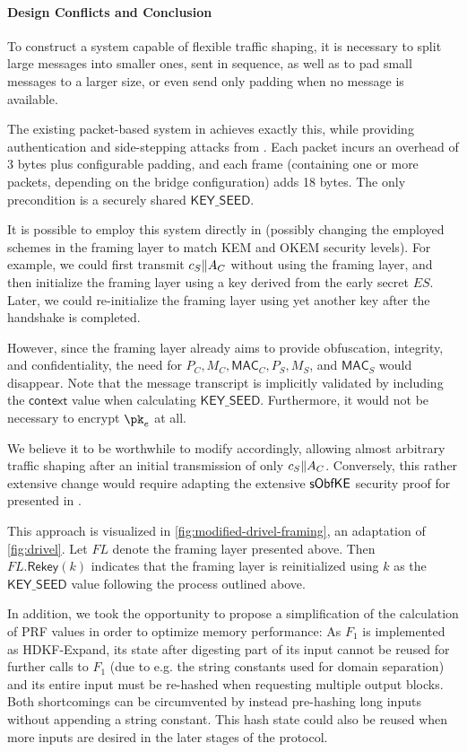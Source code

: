\paragraph{Design Conflicts and Conclusion}

To construct a system capable of flexible traffic shaping, it is necessary to split large messages into smaller ones, sent in sequence, as well as to pad small messages to a larger size, or even send only padding when no message is available.

The existing packet-based system in \obfsfour{} achieves exactly this, while providing authentication and side-stepping attacks from \cite{SP:AlbPatWat09}. Each packet incurs an overhead of 3 bytes plus configurable padding, and each frame (containing one or more packets, depending on the bridge configuration) adds 18 bytes.
The only precondition is a securely shared $\mathsf{KEY\_SEED}$.

It is possible to employ this system directly in \drivel{} (possibly changing the employed schemes in the framing layer to match KEM and OKEM security levels).
For example, we could first transmit $c_S \| A_C$ without using the framing layer, and then initialize the framing layer using a key derived from the early secret $ES$. Later, we could re-initialize the framing layer using yet another key after the handshake is completed.

However, since the framing layer already aims to provide obfuscation, integrity, and confidentiality, the need for $P_C, M_C, \mathsf{MAC}_C, P_S, M_S$, and $\mathsf{MAC}_S$ would disappear. Note that the message transcript is implicitly validated by including the $\mathsf{context}$ value when calculating $\mathsf{KEY\_SEED}$. Furthermore, it would not be necessary to encrypt $\pk_e$ at all.

We believe it to be worthwhile to modify \drivel{} accordingly, allowing almost arbitrary traffic shaping after an initial transmission of only $c_S \| A_C$.
Conversely, this rather extensive change would require adapting the extensive $\mathsf{sObfKE}$ security proof for \drivel{} presented in \cite{EPRINT:GRSV25}.

This approach is visualized in \cref{fig:modified-drivel-framing}, an adaptation of \cref{fig:drivel}. Let $FL$ denote the framing layer presented above. Then $FL.\mathsf{Rekey}(k)$ indicates that the framing layer is reinitialized using $k$ as the $\mathsf{KEY\_SEED}$ value following the process outlined above.

In addition, we took the opportunity to propose a simplification of the calculation of PRF values in order to optimize memory performance:
As $F_1$ is implemented as \textsf{HDKF-Expand}, its state after digesting part of its input cannot be reused for further calls to $F_1$ (due to e.g. the string constants used for domain separation) and its entire input must be re-hashed when requesting multiple output blocks.
Both shortcomings can be circumvented by instead pre-hashing long inputs without appending a string constant. This hash state could also be reused when more inputs are desired in the later stages of the protocol.

